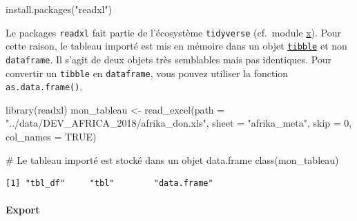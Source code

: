 \documentclass[
  letterpaper,
  DIV=11,
  numbers=noendperiod]{scrartcl}
\let\oldparagraph\paragraph
\renewcommand{\paragraph}[1]{\oldparagraph{#1}\mbox{}}
\newenvironment{Shaded}{\begin{snugshade}}{\end{snugshade}}
\newcommand{\AttributeTok}[1]{\textcolor[rgb]{0.40,0.45,0.13}{#1}}
\newcommand{\CommentTok}[1]{\textcolor[rgb]{0.37,0.37,0.37}{#1}}
\newcommand{\ConstantTok}[1]{\textcolor[rgb]{0.56,0.35,0.01}{#1}}
\newcommand{\DecValTok}[1]{\textcolor[rgb]{0.68,0.00,0.00}{#1}}
\newcommand{\FunctionTok}[1]{\textcolor[rgb]{0.28,0.35,0.67}{#1}}
\newcommand{\NormalTok}[1]{\textcolor[rgb]{0.00,0.23,0.31}{#1}}
\newcommand{\OtherTok}[1]{\textcolor[rgb]{0.00,0.23,0.31}{#1}}
\newcommand{\StringTok}[1]{\textcolor[rgb]{0.13,0.47,0.30}{#1}}
\begin{document}
\begin{Shaded}
\begin{Highlighting}[]
\FunctionTok{install.packages}\NormalTok{(}\StringTok{"readxl"}\NormalTok{)}
\end{Highlighting}
\end{Shaded}

\begin{tcolorbox}[enhanced jigsaw, opacityback=0, bottomrule=.15mm, titlerule=0mm, left=2mm, bottomtitle=1mm, title=\textcolor{quarto-callout-important-color}{\faExclamation}\hspace{0.5em}{Important}, opacitybacktitle=0.6, breakable, colbacktitle=quarto-callout-important-color!10!white, leftrule=.75mm, colframe=quarto-callout-important-color-frame, rightrule=.15mm, toprule=.15mm, coltitle=black, arc=.35mm, colback=white, toptitle=1mm]

Le packages \texttt{readxl} fait partie de l'écosystème
\texttt{tidyverse} (cf.~module \href{}{x}). Pour cette raison, le
tableau importé est mis en mémoire dans un objet
\href{https://tibble.tidyverse.org/}{\texttt{tibble}} et non
\texttt{dataframe}. Il s'agit de deux objets très semblables mais pas
identiques. Pour convertir un \texttt{tibble} en \texttt{dataframe},
vous pouvez utiliser la fonction \texttt{as.data.frame()}.

\end{tcolorbox}

\begin{Shaded}
\begin{Highlighting}[]
\FunctionTok{library}\NormalTok{(readxl)}
\NormalTok{mon\_tableau }\OtherTok{\textless{}{-}} \FunctionTok{read\_excel}\NormalTok{(}\AttributeTok{path =} \StringTok{"../data/DEV\_AFRICA\_2018/afrika\_don.xls"}\NormalTok{, }
                          \AttributeTok{sheet =} \StringTok{"afrika\_meta"}\NormalTok{, }
                          \AttributeTok{skip =} \DecValTok{0}\NormalTok{,}
                          \AttributeTok{col\_names =} \ConstantTok{TRUE}\NormalTok{)}

\CommentTok{\# Le tableau importé est stocké dans un objet data.frame}
\FunctionTok{class}\NormalTok{(mon\_tableau)}
\end{Highlighting}
\end{Shaded}

\begin{verbatim}
[1] "tbl_df"     "tbl"        "data.frame"
\end{verbatim}

\hypertarget{export-1}{%
\paragraph{Export}\label{export-1}}
\end{document}

